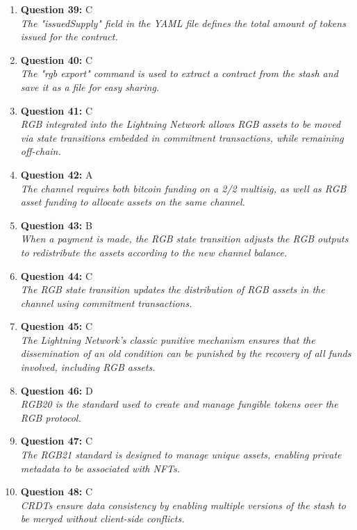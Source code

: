 \documentclass[12pt,a4paper]{article}
\begin{document}
\begin{enumerate}
\item \textbf{Question 39:} C
\\ \textit{The "issuedSupply" field in the YAML file defines the total amount of tokens issued for the contract.}

\item \textbf{Question 40:} C
\\ \textit{The "rgb export" command is used to extract a contract from the stash and save it as a file for easy sharing.}

\item \textbf{Question 41:} C
\\ \textit{RGB integrated into the Lightning Network allows RGB assets to be moved via state transitions embedded in commitment transactions, while remaining off-chain.}

\item \textbf{Question 42:} A
\\ \textit{The channel requires both bitcoin funding on a 2/2 multisig, as well as RGB asset funding to allocate assets on the same channel.}

\item \textbf{Question 43:} B
\\ \textit{When a payment is made, the RGB state transition adjusts the RGB outputs to redistribute the assets according to the new channel balance.}

\item \textbf{Question 44:} C
\\ \textit{The RGB state transition updates the distribution of RGB assets in the channel using commitment transactions.}

\item \textbf{Question 45:} C
\\ \textit{The Lightning Network's classic punitive mechanism ensures that the dissemination of an old condition can be punished by the recovery of all funds involved, including RGB assets.}

\item \textbf{Question 46:} D
\\ \textit{RGB20 is the standard used to create and manage fungible tokens over the RGB protocol.}

\item \textbf{Question 47:} C
\\ \textit{The RGB21 standard is designed to manage unique assets, enabling private metadata to be associated with NFTs.}

\item \textbf{Question 48:} C
\\ \textit{CRDTs ensure data consistency by enabling multiple versions of the stash to be merged without client-side conflicts.}


\end{enumerate}
\end{document}
